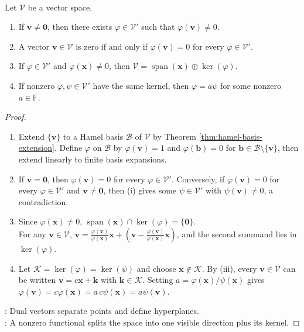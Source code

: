 \begin{proposition} \label{prop:functionals-separate-points} \\
Let $\mathcal{V}$ be a vector space.
\begin{enumerate}[label=(\roman*)]
\setlength{\itemsep}{0pt}
\item If $\mathbf{v}\neq\mathbf{0}$, then there exists $\varphi\in\mathcal{V}'$ such that $\varphi(\mathbf{v})\neq0$.
\item A vector $\mathbf{v}\in\mathcal{V}$ is zero if and only if $\varphi(\mathbf{v})=0$ for every $\varphi\in\mathcal{V}'$.
\item If $\varphi\in\mathcal{V}'$ and $\varphi(\mathbf{x})\neq0$, then $\mathcal{V}=\operatorname{span}(\mathbf{x})\oplus\ker(\varphi)$.
\item If nonzero $\varphi,\psi\in\mathcal{V}'$ have the same kernel, then $\varphi=a\psi$ for some nonzero $a\in\mathbb{F}$.
\end{enumerate}
\begin{proof}
\begin{enumerate}[label=(\roman*)]
\setlength{\itemsep}{0pt}
\item Extend $\{\mathbf{v}\}$ to a Hamel basis $\mathcal{B}$ of $\mathcal{V}$ by Theorem \ref{thm:hamel-basis-extension}. Define $\varphi$ on $\mathcal{B}$ by $\varphi(\mathbf{v})=1$ and $\varphi(\mathbf{b})=0$ for $\mathbf{b}\in\mathcal{B}\setminus\{\mathbf{v}\}$, then extend linearly to finite basis expansions.
\item If $\mathbf{v}=\mathbf{0}$, then $\varphi(\mathbf{v})=0$ for every $\varphi\in\mathcal{V}'$. Conversely, if $\varphi(\mathbf{v})=0$ for every $\varphi\in\mathcal{V}'$ and $\mathbf{v}\neq\mathbf{0}$, then (i) gives some $\psi\in\mathcal{V}'$ with $\psi(\mathbf{v})\neq0$, a contradiction.
\item Since $\varphi(\mathbf{x})\neq0$, $\operatorname{span}(\mathbf{x})\cap\ker(\varphi)=\{\mathbf{0}\}$.\\
For any $\mathbf{v}\in\mathcal{V}$, $\mathbf{v}=\frac{\varphi(\mathbf{v})}{\varphi(\mathbf{x})}\mathbf{x}
       +\left(\mathbf{v}-\frac{\varphi(\mathbf{v})}{\varphi(\mathbf{x})}\mathbf{x}\right)$, and the second summand lies in $\ker(\varphi)$.
\item Let $\mathcal{K}=\ker(\varphi)=\ker(\psi)$ and choose $\mathbf{x}\notin\mathcal{K}$. By (iii), every $\mathbf{v}\in\mathcal{V}$ can be written $\mathbf{v}=c\mathbf{x}+\mathbf{k}$ with $\mathbf{k}\in\mathcal{K}$. Setting $a=\varphi(\mathbf{x})/\psi(\mathbf{x})$ gives $\varphi(\mathbf{v})=c\varphi(\mathbf{x})=a\,c\psi(\mathbf{x})=a\psi(\mathbf{v})$.
\end{enumerate}
: Dual vectors separate points and define hyperplanes.\\
: A nonzero functional splits the space into one visible direction plus its kernel.
\end{proof}
\end{proposition}

